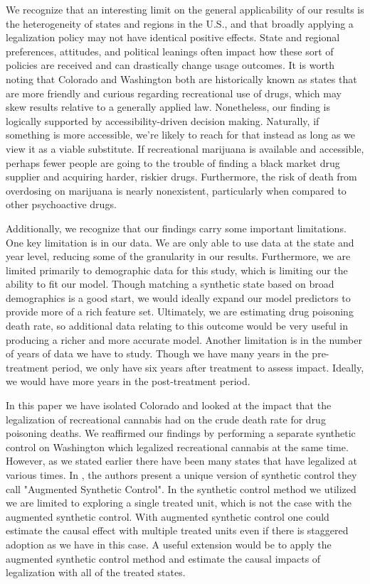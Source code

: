 \documentclass{article}
\begin{document}
We recognize that an interesting limit on the general applicability of our results is the heterogeneity of states and regions in the U.S., and that broadly applying a legalization policy may not have identical positive effects. State and regional preferences, attitudes, and political leanings often impact how these sort of policies are received and can drastically change usage outcomes. It is worth noting that Colorado and Washington both are historically known as states that are more friendly and curious regarding recreational use of drugs, which may skew results relative to a generally applied law. Nonetheless, our finding is logically supported by accessibility-driven decision making. Naturally, if something is more accessible, we're likely to reach for that instead as long as we view it as a viable substitute. If recreational marijuana is available and accessible, perhaps fewer people are going to the trouble of finding a black market drug supplier and acquiring harder, riskier drugs. Furthermore, the risk of death from overdosing on marijuana is nearly nonexistent, particularly when compared to other psychoactive drugs.

Additionally, we recognize that our findings carry some important limitations. One key limitation is in our data. We are only able to use data at the state and year level, reducing some of the granularity in our results. Furthermore, we are limited primarily to demographic data for this study, which  is limiting our the ability to fit our model. Though matching a synthetic state based on broad demographics is a good start, we would ideally expand our model predictors to provide more of a rich feature set. Ultimately, we are estimating drug poisoning death rate, so additional data relating to this outcome would be very useful in producing a richer and more accurate model. Another limitation is in the number of years of data we have to study. Though we have many years in the pre-treatment period, we only have six years after treatment to assess impact. Ideally, we would have more years in the post-treatment period.

In this paper we have isolated Colorado and looked at the impact that the legalization of recreational cannabis had on the crude death rate for drug poisoning deaths. We reaffirmed our findings by performing a separate synthetic control on Washington which legalized recreational cannabis at the same time. However, as we stated earlier there have been many states that have legalized at various times. In \citet{aug-synth}, the authors present a unique version of synthetic control they call "Augmented Synthetic Control". In the synthetic control method we utilized we are limited to exploring a single treated unit, which is not the case with the augmented synthetic control. With augmented synthetic control one could estimate the causal effect with multiple treated units even if there is staggered adoption as we have in this case. A useful extension would be to apply the augmented synthetic control method and estimate the causal impacts of legalization with all of the treated states.
\end{document}
